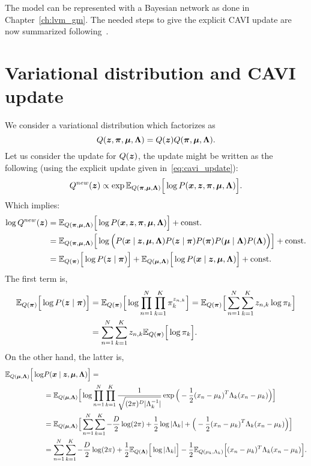 The model can be represented with a Bayesian network as done in Chapter~\ref{ch:lvm_gm}. The needed steps to give the explicit CAVI update are now summarized following~\cite{bishop2006pattern}.

\section{Variational distribution and CAVI update}

We consider a variational distribution which factorizes as
\[
  Q(\bm{z}, \bm{\pi}, \bm{\mu}, \bm{\Lambda}) = Q(\bm{z})Q(\bm{\pi}, \bm{\mu}, \bm{\Lambda}).
\]
Let us consider the update for \(Q(\bm{z})\), the update might be written as the following (using the explicit update given in~\ref{eq:cavi_update}):
\[
  Q^{new}(\bm{z}) \propto \exp \mathbb{E}_{Q(\bm{\pi}, \bm{\mu}, \bm{\Lambda})}\Big[\log P(\bm{x}, \bm{z}, \bm{\pi}, \bm{\mu}, \bm{\Lambda})\Big].
\]
Which implies:
\[
  \begin{aligned}
    \log Q^{new}(\bm{z}) &= \mathbb{E}_{Q(\bm{\pi}, \bm{\mu}, \bm{\Lambda})}\Big[\log P(\bm{x}, \bm{z}, \bm{\pi}, \bm{\mu}, \bm{\Lambda})\Big] + \text{const.}\\
    &= \mathbb{E}_{Q(\bm{\pi}, \bm{\mu}, \bm{\Lambda})}\Big[\log \Big( P(\bm{x} \mid \bm{z}, \bm{\mu}, \bm{\Lambda})P(\bm{z} \mid \bm{\pi})P(\bm{\pi})P(\bm{\mu} \mid \bm{\Lambda})P(\bm{\Lambda}) \Big)\Big] + \text{const.}\\
    &= \mathbb{E}_{Q(\bm{\pi})}\Big[\log P(\bm{z} \mid \bm{\pi})\Big] + \mathbb{E}_{Q(\bm{\mu}, \bm{\Lambda})}\Big[\log P(\bm{x} \mid \bm{z}, \bm{\mu}, \bm{\Lambda})\Big] + \text{const.}
  \end{aligned}
\]
The first term is,
\[
  \begin{aligned}
    \mathbb{E}_{Q(\bm{\pi})}\Big[\log P(\bm{z} \mid \bm{\pi})\Big] &=  \mathbb{E}_{Q(\bm{\pi})}\Big[\log \prod_{n=1}^{N}\prod_{k=1}^{K}\pi_{k}^{z_{n,k}}\Big] = \mathbb{E}_{Q(\bm{\pi})}\Big[\sum_{n=1}^{N}\sum_{k=1}^{K}z_{n,k}\log \pi_{k}\Big]\\
    &= \sum_{n=1}^{N}\sum_{k=1}^{K}z_{n,k} \mathbb{E}_{Q(\bm{\pi})}\Big[\log \pi_{k}\Big].
  \end{aligned}
\]
On the other hand, the latter is,
\[
    \begin{aligned}
    \mathbb{E}_{Q(\bm{\mu}, \bm{\Lambda})}\Big[\log& P(\bm{x} \mid \bm{z}, \bm{\mu}, \bm{\Lambda})\Big] =\\
    &=  \mathbb{E}_{Q(\bm{\mu}, \bm{\Lambda})}\Big[\log \prod_{n=1}^{N}\prod_{k=1}^{K} \frac{1}{\sqrt{(2\pi)^{D}|\Lambda_{k}^{-1}|}} \exp \Big( -\frac{1}{2}{(x_{n} - \mu_{k})}^{T}\Lambda_{k}(x_{n}- \mu_{k}) \Big)  \Big]\\
    &=  \mathbb{E}_{Q(\bm{\mu}, \bm{\Lambda})}\Big[ \sum_{n=1}^{N}\sum_{k=1}^{K}- \frac{D}{2}\log (2\pi)+  \frac{1}{2}\log |\Lambda_{k}|+ \Big( -\frac{1}{2}{(x_{n} - \mu_{k})}^{T}\Lambda_{k}(x_{n}- \mu_{k}) \Big)  \Big]\\
    &=  \sum_{n=1}^{N}\sum_{k=1}^{K}  - \frac{D}{2} \log (2\pi)+ \frac{1}{2}\mathbb{E}_{Q(\bm{\Lambda})}\Big[\log |\Lambda_{k}|\Big]- \frac{1}{2}\mathbb{E}_{Q(\mu_{k}, \Lambda_{k})}\Big[(x_{n} - \mu_{k})^{T}\Lambda_{k}(x_{n} - \mu_{k})\Big].
    \end{aligned}
\]

